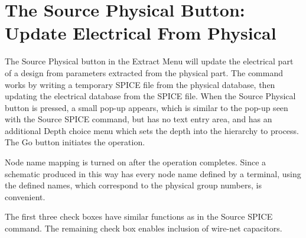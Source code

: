 \section{The {\cb Source Physical} Button: Update Electrical From Physical}
The {\cb Source Physical} button in the {\cb Extract Menu} will update
the electrical part of a design from parameters extracted from the
physical part.  The command works by writing a temporary SPICE file
from the physical database, then updating the electrical database from
the SPICE file.  When the {\cb Source Physical} button is pressed, a
small pop-up appears, which is similar to the pop-up seen with the
{\cb Source SPICE} command, but has no text entry area, and has an
additional {\cb Depth} choice menu which sets the depth into the
hierarchy to process.  The {\cb Go} button initiates the operation.

Node name mapping is turned on after the operation completes.  Since a
schematic produced in this way has every node name defined by a
terminal, using the defined names, which correspond to the physical
group numbers, is convenient.

The first three check boxes have similar functions as in the {\cb
Source SPICE} command.  The remaining check box enables inclusion of
wire-net capacitors.


